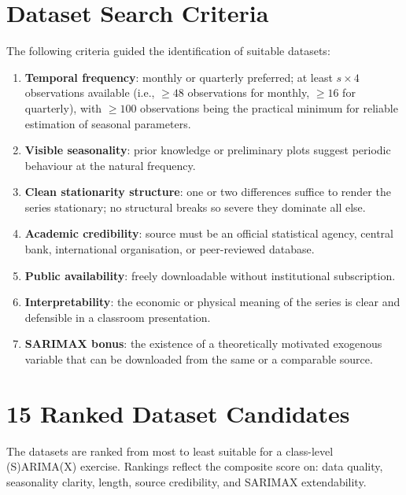\documentclass[12pt,a4paper]{article}
\begin{document}
\section{Dataset Search Criteria}

The following criteria guided the identification of suitable datasets:

\begin{enumerate}[noitemsep]
  \item \textbf{Temporal frequency}: monthly or quarterly preferred; at least
  $s\times 4$ observations available (i.e., $\ge 48$ observations for monthly,
  $\ge 16$ for quarterly), with $\ge 100$ observations being the practical minimum
  for reliable estimation of seasonal parameters.
  \item \textbf{Visible seasonality}: prior knowledge or preliminary plots suggest
  periodic behaviour at the natural frequency.
  \item \textbf{Clean stationarity structure}: one or two differences suffice to
  render the series stationary; no structural breaks so severe they dominate all
  else.
  \item \textbf{Academic credibility}: source must be an official statistical
  agency, central bank, international organisation, or peer-reviewed database.
  \item \textbf{Public availability}: freely downloadable without institutional
  subscription.
  \item \textbf{Interpretability}: the economic or physical meaning of the series
  is clear and defensible in a classroom presentation.
  \item \textbf{SARIMAX bonus}: the existence of a theoretically motivated
  exogenous variable that can be downloaded from the same or a comparable source.
\end{enumerate}

\section{15 Ranked Dataset Candidates}

The datasets are ranked from most to least suitable for a class-level
(S)ARIMA(X) exercise. Rankings reflect the composite score on: data quality,
seasonality clarity, length, source credibility, and SARIMAX extendability.
\end{document}

